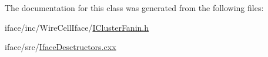 The documentation for this class was generated from the following files\+:\begin{DoxyCompactItemize}
\item 
iface/inc/\+Wire\+Cell\+Iface/\hyperlink{_i_cluster_fanin_8h}{I\+Cluster\+Fanin.\+h}\item 
iface/src/\hyperlink{_iface_desctructors_8cxx}{Iface\+Desctructors.\+cxx}\end{DoxyCompactItemize}
